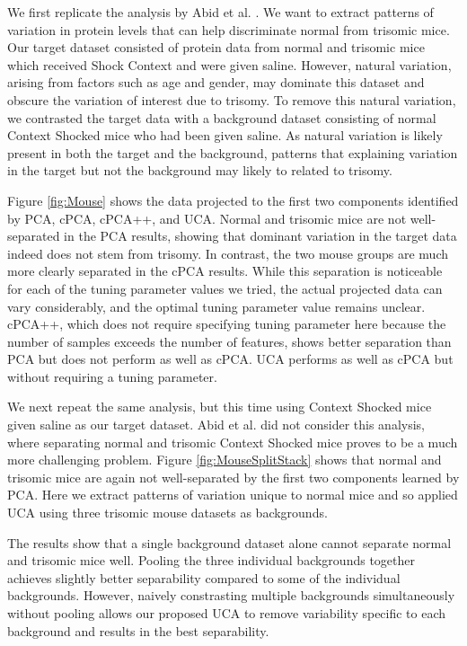 \documentclass[10pt]{article}
\begin{document}
We first replicate the analysis by Abid et al. \cite{Abid}. We want to extract patterns of variation in protein levels that can help discriminate normal from trisomic mice. Our target dataset consisted of protein data from normal and trisomic mice which received Shock Context and were given saline. However, natural variation, arising from factors such as age and gender, may dominate this dataset and obscure the variation of interest due to trisomy. To remove this natural variation, we contrasted the target data with a background dataset consisting of normal Context Shocked mice who had been given saline. As natural variation is likely present in both the target and the background, patterns that explaining variation in the target but not the background may likely to related to trisomy.

Figure \ref{fig:Mouse} shows the data projected to the first two components identified by PCA, cPCA, cPCA++, and UCA. Normal and trisomic mice are not well-separated in the PCA results, showing that dominant variation in the target data indeed does not stem from trisomy. In contrast, the two mouse groups are much more clearly separated in the cPCA results. While this separation is noticeable for each of the tuning parameter values we tried, the actual projected data can vary considerably, and the optimal tuning parameter value remains unclear.
cPCA++, which does not require specifying tuning parameter here because the number of samples exceeds the number of features, shows better separation than PCA but does not perform as well as cPCA. UCA performs as well as cPCA but without requiring a tuning parameter.



We next repeat the same analysis, but this time using Context Shocked mice given saline as our target dataset. Abid et al. \cite{Abid} did not consider this analysis, where separating normal and trisomic Context Shocked mice proves to be a much more challenging problem. Figure \ref{fig:MouseSplitStack} shows that normal and trisomic mice are again not well-separated by the first two components learned by PCA.
Here we extract patterns of variation unique to normal mice and so applied UCA using three trisomic mouse datasets as backgrounds.

The results show that a single background dataset alone cannot separate normal and trisomic mice well. Pooling the three individual backgrounds together achieves slightly better separability compared to some of the individual backgrounds. However, naively constrasting multiple backgrounds simultaneously without pooling allows our proposed UCA to remove variability specific to each background and results in the best separability.
\end{document}
